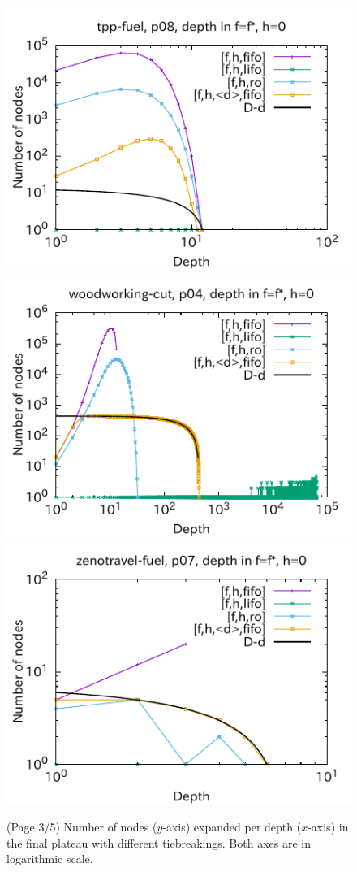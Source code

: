 \begin{figure}[htbp]
\includegraphics{img/output-lmcut/tpp-fuel/p08-0.pdf}
\includegraphics{img/output-lmcut/woodworking-cut/p04-0.pdf}
\includegraphics{img/output-lmcut/zenotravel-fuel/p07-0.pdf}
 \caption{(Page 3/5) Number of nodes ($y$-axis) expanded per depth ($x$-axis) in
 the final plateau with different tiebreakings. Both axes are in logarithmic scale.
 }
 \label{fig:depth-histogram3}
\end{figure}

